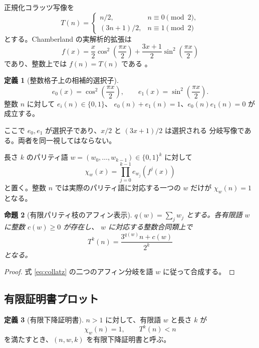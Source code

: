 \documentclass[a4paper,11pt]{ltjsarticle}
\theoremstyle{definition}
\newtheorem{definition}{定義}[section]
\theoremstyle{plain}
\newtheorem{proposition}[definition]{命題}
\newcommand{\1}{\mathbf{1}}
\begin{document}
正規化コラッツ写像を
\begin{equation}\label{eq:collatz}
 T(n)=
 \begin{cases}
  n/2,&n\equiv0\pmod2,\\
  (3n+1)/2,&n\equiv1\pmod2
 \end{cases}
\end{equation}
とする。Chamberland の実解析的拡張は
\begin{equation}\label{eq:chamberland}
 f(x)=\frac{x}{2}\cos^2\!\left(\frac{\pi x}{2}\right)
 +\frac{3x+1}{2}\sin^2\!\left(\frac{\pi x}{2}\right)
\end{equation}
であり、整数上では $f(n)=T(n)$ である \cite{Chamberland1996}。

\begin{definition}[整数格子上の相補的選択子]
\[
 e_0(x)=\cos^2\!\left(\frac{\pi x}{2}\right),
 \qquad
 e_1(x)=\sin^2\!\left(\frac{\pi x}{2}\right).
\]
整数 $n$ に対して $e_i(n)\in\{0,1\}$、
$e_0(n)+e_1(n)=1$、$e_0(n)e_1(n)=0$ が成立する。
\end{definition}

ここで $e_0,e_1$ が選択子であり、$x/2$ と $(3x+1)/2$ は選択される
分岐写像である。両者を同一視してはならない。

長さ $k$ のパリティ語 $w=(w_0,\ldots,w_{k-1})\in\{0,1\}^k$ に対して
\begin{equation}\label{eq:selector}
 \chi_w(x)=\prod_{j=0}^{k-1}e_{w_j}(f^j(x))
\end{equation}
と置く。整数 $n$ では実際のパリティ語に対応する一つの $w$ だけが
$\chi_w(n)=1$ となる。

\begin{proposition}[有限パリティ枝のアフィン表示]\label{prop:affine}
$q(w)=\sum_jw_j$ とする。各有限語 $w$ に整数 $c(w)\ge0$ が存在し、
$w$ に対応する整数合同類上で
\begin{equation}\label{eq:affine}
 T^k(n)=\frac{3^{q(w)}n+c(w)}{2^k}
\end{equation}
となる。
\end{proposition}

\begin{proof}
式 \eqref{eq:collatz} の二つのアフィン分岐を語 $w$ に従って合成する。
\end{proof}

\subsection{有限証明書プロット}

\begin{definition}[有限下降証明書]
$n>1$ に対して、有限語 $w$ と長さ $k$ が
\[
 \chi_w(n)=1,
 \qquad T^k(n)<n
\]
を満たすとき、$(n,w,k)$ を有限下降証明書と呼ぶ。
\end{definition}
\end{document}
